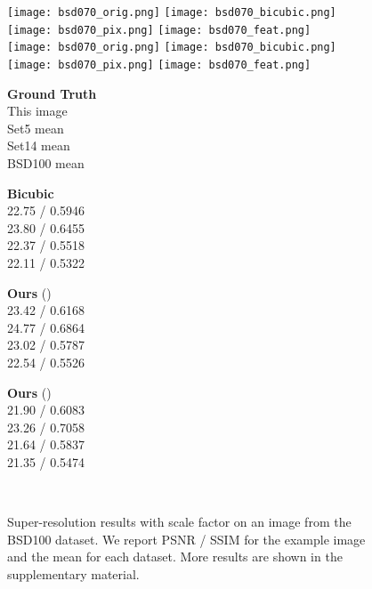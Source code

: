 \documentclass[runningheads]{llncs}
\begin{document}
\begin{figure}[t]
   \centering
\texttt{[image: bsd070\_orig.png]}
  \texttt{[image: bsd070\_bicubic.png]}
  \texttt{[image: bsd070\_pix.png]}
  \texttt{[image: bsd070\_feat.png]} \\
  \texttt{[image: bsd070\_orig.png]}
  \texttt{[image: bsd070\_bicubic.png]}
  \texttt{[image: bsd070\_pix.png]}
  \texttt{[image: bsd070\_feat.png]} \\
  \vspace{1mm}
  \begin{minipage}{0.22\textwidth}
    \centering \textbf{Ground Truth} \\ This image \\ Set5 mean \\ Set14 mean \\ BSD100 mean
  \end{minipage}
  \begin{minipage}{0.22\textwidth}
    \centering \textbf{Bicubic} \\ 22.75 / 0.5946 \\ 23.80 / 0.6455 \\ 22.37 / 0.5518 \\ 22.11 / 0.5322
  \end{minipage}
  \begin{minipage}{0.22\textwidth}
    \centering \textbf{Ours} () \\ 23.42 / 0.6168 \\ 24.77 / 0.6864 \\ 23.02 / 0.5787
      \\ 22.54 / 0.5526 
  \end{minipage}
  \begin{minipage}{0.22\textwidth}
    \centering \textbf{Ours} () \\  21.90 / 0.6083 \\ 23.26 / 0.7058 \\ 21.64 / 0.5837 
      \\ 21.35 / 0.5474
  \end{minipage} \\
\vspace{-2mm}
  \caption{Super-resolution results with scale factor  on an image from the
    BSD100 dataset. We report PSNR / SSIM for the example image and the mean
    for each dataset. More results are shown in the supplementary material.
  }
  \vspace{-4mm}
  \label{fig:SR-8x-results}
\end{figure}
\end{document}
